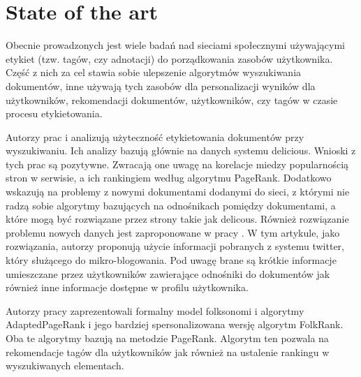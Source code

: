 





%
\chapter{State of the art}

Obecnie prowadzonych jest wiele badań nad sieciami społecznymi używającymi etykiet (tzw. tagów, czy adnotacji) do porządkowania zasobów użytkownika. Część z nich za cel stawia sobie ulepszenie algorytmów wyszukiwania dokumentów, inne używają tych zasobów dla personalizacji wyników dla użytkowników, rekomendacji dokumentów, użytkowników, czy tagów w czasie procesu etykietowania.

Autorzy prac \cite{yanbe2007} i \cite{citeulike:3423869} analizują użyteczność etykietowania dokumentów przy wyszukiwaniu. Ich analizy bazują głównie na danych systemu delicious. Wnioski z tych prac są pozytywne. Zwracają one uwagę na korelacje miedzy popularnością stron w serwisie, a ich rankingiem według algorytmu PageRank. Dodatkowo wskazują na problemy z nowymi dokumentami dodanymi do sieci, z którymi nie radzą sobie algorytmy bazujących na odnośnikach pomiędzy dokumentami, a które mogą być rozwiązane przez strony takie jak delicous. Również rozwiązanie problemu nowych danych jest zaproponowane w pracy \cite{citeulike:8024203}. W tym artykule, jako rozwiązania, autorzy proponują użycie informacji pobranych z systemu twitter, który służącego do mikro-blogowania. Pod uwagę brane są krótkie informacje umieszczane przez użytkowników zawierające odnośniki do dokumentów jak również inne informacje dostępne w profilu użytkownika.

Autorzy pracy \cite{hotho2006information} zaprezentowali formalny model folksonomi i algorytmy AdaptedPageRank i jego bardziej spersonalizowana wersję algorytm FolkRank. Oba te algorytmy bazują na metodzie PageRank. Algorytm ten pozwala na rekomendacje tagów dla użytkowników jak również na ustalenie rankingu w wyszukiwanych elementach. 

